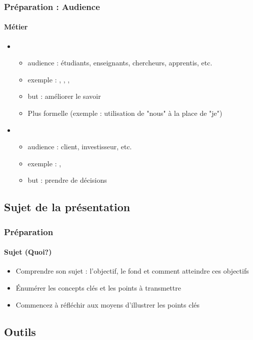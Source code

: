 \documentclass[xcolor=table, usenames,dvipsnames]{beamer}
\begin{document}
\begin{frame}
\frametitle{Préparation : Audience}
\framesubtitle{Métier}

\begin{itemize}
	\item {}
	\begin{itemize}
		\item audience : étudiants, enseignants, chercheurs, apprentis, etc.
		\item exemple : , , , 
		\item but : améliorer le savoir
		\item Plus formelle (exemple : utilisation de "nous" à la place de "je")
	\end{itemize}
	\item {}
	\begin{itemize}
		\item audience : client, investisseur, etc.
		\item exemple : , 
		\item but : prendre de décisions
	\end{itemize}
\end{itemize}

\end{frame}

\subsection{Sujet de la présentation}

\begin{frame}
\frametitle{Préparation}
\framesubtitle{Sujet (Quoi?)}

\begin{itemize}
	\item Comprendre son sujet : l'objectif, le fond et comment atteindre ces objectifs
	\item Énumérer les concepts clés et les points à transmettre
	\item Commencez à réfléchir aux moyens d'illustrer les points clés
\end{itemize}

\end{frame}

\subsection{Outils}
\end{document}
